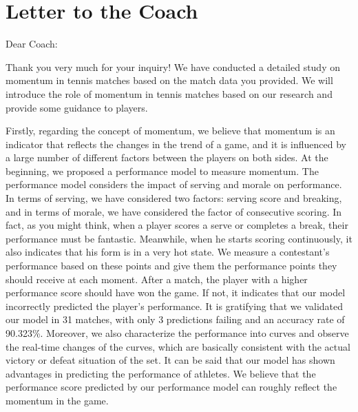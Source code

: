 \documentclass{mcmthesis}
\begin{document}
\section{Letter to the Coach}

\begin{letter}{Dear Coach:}

\end{letter}
Thank you very much for your inquiry! We have conducted a detailed study on momentum in tennis matches based on the match data you provided. We will introduce the role of momentum in tennis matches based on our research and provide some guidance to players.

Firstly, regarding the concept of momentum, we believe that momentum is an indicator that reflects the changes in the trend of a game, and it is influenced by a large number of different factors between the players on both sides. At the beginning, we proposed a performance model to measure momentum. The performance model considers the impact of serving and morale on performance. In terms of serving, we have considered two factors: serving score and breaking, and in terms of morale, we have considered the factor of consecutive scoring. In fact, as you might think, when a player scores a serve or completes a break, their performance must be fantastic. Meanwhile, when he starts scoring continuously, it also indicates that his form is in a very hot state. We measure a contestant's performance based on these points and give them the performance points they should receive at each moment. After a match, the player with a higher performance score should have won the game. If not, it indicates that our model incorrectly predicted the player's performance. It is gratifying that we validated our model in 31 matches, with only 3 predictions failing and an accuracy rate of 90.323\%. Moreover, we also characterize the performance into curves and observe the real-time changes of the curves, which are basically consistent with the actual victory or defeat situation of the set. It can be said that our model has shown advantages in predicting the performance of athletes. We believe that the performance score predicted by our performance model can roughly reflect the momentum in the game.
\end{document}
